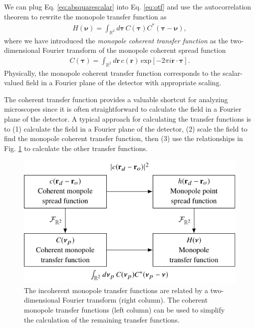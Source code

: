 \documentclass[]{osa-article}
\providecommand{\mb}[1]{\mathbf{#1}}
\providecommand{\mbb}[1]{\mathbb{#1}}
\providecommand{\bs}[1]{\boldsymbol{#1}}
\providecommand{\bv}{\bs{\nu}}
\providecommand{\taup}{\bs{\tau}}
\begin{document}
We can plug Eq. \eqref{eq:absquarescalar} into Eq. \eqref{eq:otf} and use the
autocorrelation theorem to rewrite the monopole transfer function as
\begin{align}
  H(\bv) = \int_{\mbb{R}^2}d\taup\, C(\taup)C^*(\taup - \bv), 
\end{align}
where we have introduced the
\textit{monopole coherent transfer function} as the two-dimensional Fourier
transform of the monopole coherent spread function
\begin{align}
  C(\taup) = \int_{\mbb{R}^2}d\mb{r}\, c(\mb{r})\,\text{exp}[-2\pi i\mb{r}\cdot\taup].
\end{align}
Physically, the monopole coherent transfer function corresponds to the
scalar-valued field in a Fourier plane of the detector with appropriate scaling.

The coherent transfer function provides a valuable shortcut for analyzing
microscopes since it is often straightforward to calculate the field in a
Fourier plane of the detector. A typical approach for calculating the transfer
functions is to (1) calculate the field in a Fourier plane of the detector, (2)
scale the field to find the monopole coherent transfer function, then (3) use
the relationships in Fig. \ref{fig:monopole-transfer-functions} to calculate
the other transfer functions.

\begin{figure}
  \centering
  \includegraphics[scale=1.0]{../figures/monopole-transfer-functions/monopole-transfer-functions.pdf}
  \caption{The incoherent monopole transfer functions are related by a
    two-dimensional Fourier transform (right column). The coherent monopole
    transfer functions (left column) can be used to simplify the calculation of
    the remaining transfer functions.}
   \label{fig:monopole-transfer-functions}
 \end{figure}
\end{document}
